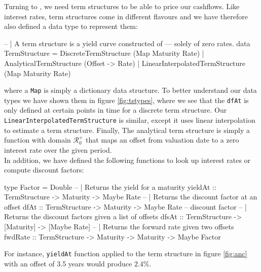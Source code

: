 Turning to \hql, we need term structures to be able to price our cashflows.
Like interest rates, term structures come in different flavours and we 
have therefore also defined a data type to represent them:

\begin{hscode}
-- | A term structure is a yield curve constructed of
--- solely of zero rates.
data TermStructure = DiscreteTermStructure (Map Maturity Rate)
                   | AnalyticalTermStructure (Offset -> Rate)
                   | LinearInterpolatedTermStructure (Map Maturity Rate)
\end{hscode}

where a \texttt{Map} is simply a dictionary data structure.
To better understand our data types we have shown them in figure \ref{fig:tstypes},
where we see that the \texttt{dfAt} is only defined at certain points in time for
a discrete term structure. Our \texttt{LinearInterpolatedTermStructure} is similar,
except it uses linear interpolation to estimate a term structure.
Finally, The analytical term structure is simply a function with domain $\mathcal{R}^+_0$
that maps an offset from valuation date to a zero interest rate over the given
period.\\

In addition, we have defined the following functions to look up interest rates
or compute discount factors:

\begin{hscode}
type Factor = Double
-- | Returns the yield for a maturity
yieldAt :: TermStructure -> Maturity -> Maybe Rate
-- | Returns the discount factor at an offset
dfAt :: TermStructure -> Maturity -> Maybe Rate -- discount factor
-- | Returns the discount factors given a list of offsets
dfsAt :: TermStructure -> [Maturity] -> [Maybe Rate]
-- | Returns the forward rate given two offsets
fwdRate :: TermStructure -> Maturity -> Maturity -> Maybe Factor
\end{hscode}

For instance, \texttt{yieldAt} function applied to the term structure in
figure \ref{fig:anc} with an offset of 3.5 years would produce $2.4\%$.

